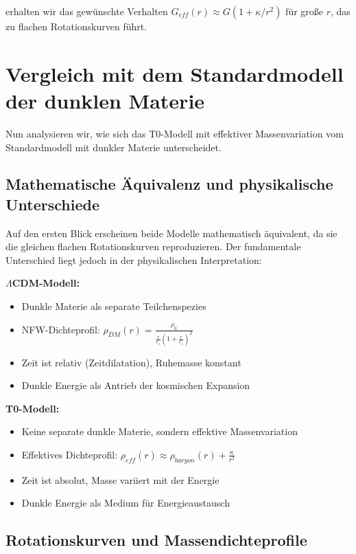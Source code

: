 \documentclass[a4paper,12pt]{article}
\begin{document}
	erhalten wir das gewünschte Verhalten $G_{eff}(r) \approx G(1 + \kappa/r^2)$ für große $r$, das zu flachen Rotationskurven führt.
	
	\section{Vergleich mit dem Standardmodell der dunklen Materie}
	
	Nun analysieren wir, wie sich das T0-Modell mit effektiver Massenvariation vom Standardmodell mit dunkler Materie unterscheidet.
	
	\subsection{Mathematische Äquivalenz und physikalische Unterschiede}
	
	Auf den ersten Blick erscheinen beide Modelle mathematisch äquivalent, da sie die gleichen flachen Rotationskurven reproduzieren. Der fundamentale Unterschied liegt jedoch in der physikalischen Interpretation:
	
	\begin{tcolorbox}[colback=green!5!white,colframe=green!75!black,title=Vergleich der Modelle]
		\textbf{$\Lambda$CDM-Modell:}
		\begin{itemize}
			\item Dunkle Materie als separate Teilchenspezies
			\item NFW-Dichteprofil: $\rho_{DM}(r) = \frac{\rho_0}{\frac{r}{r_s}(1 + \frac{r}{r_s})^2}$
			\item Zeit ist relativ (Zeitdilatation), Ruhemasse konstant
			\item Dunkle Energie als Antrieb der kosmischen Expansion
		\end{itemize}
		
		\textbf{T0-Modell:}
		\begin{itemize}
			\item Keine separate dunkle Materie, sondern effektive Massenvariation
			\item Effektives Dichteprofil: $\rho_{eff}(r) \approx \rho_{baryon}(r) + \frac{\kappa}{r^2}$
			\item Zeit ist absolut, Masse variiert mit der Energie
			\item Dunkle Energie als Medium für Energieaustausch
		\end{itemize}
	\end{tcolorbox}
	
	\subsection{Rotationskurven und Massendichteprofile}
	
\end{document}

